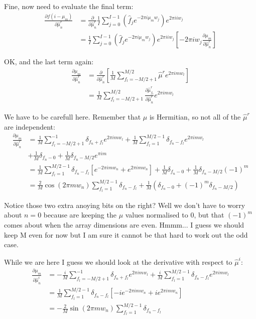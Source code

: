 \documentclass[11pt]{article}
\begin{document}
Fine, now need to evaluate the final term:
\begin{align}
   \frac{\partial f(i - \mu_m)}{\partial \hat{\mu}^r_n} &= \frac{\partial}{\partial \hat{\mu}^r_n} \frac{1}{I} \sum_{j=0}^{I-1} (\hat{f}_j e^{-2\pi i \mu_m w_j}) e^{2\pi i i w_j} \\
   &= \frac{1}{I} \sum_{j=0}^{I-1} (\hat{f}_j e^{-2\pi i \mu_m w_j}) e^{2\pi i i w_j} \left[-2\pi i w_j \frac{\partial \mu_m}{\partial \hat{\mu}^r_n} \right]
\end{align}


OK, and the last term again:
\begin{align}
   \frac{\partial \mu_m}{\partial \hat{\mu}^r_n} &= \frac{\partial}{\partial \hat{\mu}^r_n} \left[\frac{1}{M} \sum_{f_l=-M/2 + 1}^{M/2} \hat{\mu}^r e^{2\pi i mw_l} \right] \\ 
   &= \frac{1}{M} \sum_{f_l=-M/2 + 1}^{M/2} \frac{\partial \hat{\mu}^r_{f_l}}{\partial \hat{\mu}^r_n} e^{2\pi i mw_l} 
\end{align}


We have to be carefull here. Remember that $\hat{\mu}$ is Hermitian, so not all of the $\hat{\mu}^r$ are independent:
\begin{align}
   \frac{\partial \mu_m}{\partial \hat{\mu}^r_n} &= \frac{1}{M} \sum_{f_l=-M/2 + 1}^{-1} \delta_{f_n + f_l} e^{2\pi i mw_l} + \frac{1}{M} \sum_{f_l=1}^{M/2-1} \delta_{f_n - f_l} e^{2\pi i mw_l} \\
   &+ \frac{1}{M} \delta_{f_n - 0} + \frac{1}{M} \delta_{f_n - M/2} e^{\pi i m} \\
   &= \frac{1}{M} \sum_{f_l=1}^{M/2-1} \delta_{f_n - f_l} \left[e^{-2\pi i mw_n} + e^{2\pi i mw_n} \right] + \frac{1}{M} \delta_{f_n - 0} + \frac{1}{M} \delta_{f_n - M/2} (-1)^m\\
   &= \frac{2}{M} \cos(2\pi mw_n) \sum_{f_l=1}^{M/2-1} \delta_{f_n - f_l} + \frac{1}{M}\left(\delta_{f_n - 0} +  (-1)^m \delta_{f_n - M/2} \right)
\end{align}

Notice those two extra anoying bits on the right? Well we don't have to worry about $n = 0$ because are keeping the $\mu$ values normalised to 0, but that $(-1)^m$ comes about when the array dimensions are even. Hmmm... I guess we should keep M even for now but I am sure it cannot be that hard to work out the odd case. 

\pagebreak
While we are here I guess we should look at the derivative with respect to $\hat{\mu}^i$:
\begin{align}
   \frac{\partial \mu_m}{\partial \hat{\mu}^i_n} &= -\frac{i}{M} \sum_{f_l=-M/2 + 1}^{-1} \delta_{f_n + f_l} e^{2\pi i mw_l} + \frac{i}{M} \sum_{f_l=1}^{M/2-1} \delta_{f_n - f_l} e^{2\pi i mw_l} \\
   &= \frac{1}{M} \sum_{f_l=1}^{M/2-1} \delta_{f_n - f_l} \left[-ie^{-2\pi i mw_n} + ie^{2\pi i mw_n} \right] \\
   &= -\frac{2}{M} \sin(2\pi mw_n) \sum_{f_l=1}^{M/2-1} \delta_{f_n - f_l} 
\end{align}
\end{document}
